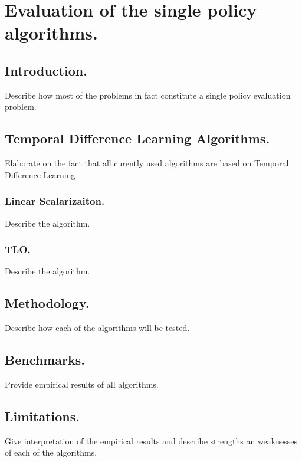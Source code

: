 \chapter{Evaluation of the single policy algorithms.}

\section{Introduction.}

Describe how most of the problems in fact constitute a single policy evaluation problem.

\section{Temporal Difference Learning Algorithms.}

Elaborate on the fact that all curently used algorithms are based on Temporal Difference Learning

\subsection{Linear Scalarizaiton.}

Describe the algorithm.

\subsection{TLO.}

Describe the algorithm.

\section{Methodology.}

Describe how each of the algorithms will be tested.

\section{Benchmarks.}

Provide empirical results of all algorithms.

\section{Limitations.}

Give interpretation of the empirical results and describe strengths an weaknesses of each of the algorithms.
